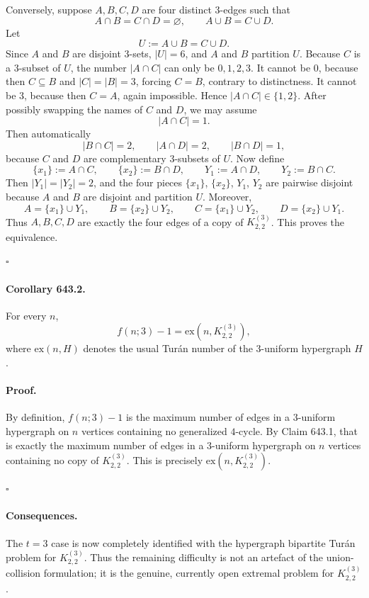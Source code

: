 Conversely, suppose $A,B,C,D$ are four distinct $3$-edges such that
\[
A\cap B=C\cap D=\varnothing,
\qquad
A\cup B=C\cup D.
\]
Let
\[
U:=A\cup B=C\cup D.
\]
Since $A$ and $B$ are disjoint $3$-sets, $|U|=6$, and $A$ and $B$ partition $U$.
Because $C$ is a $3$-subset of $U$, the number $|A\cap C|$ can only be $0,1,2,3$.
It cannot be $0$, because then $C\subseteq B$ and $|C|=|B|=3$, forcing $C=B$, contrary to distinctness.
It cannot be $3$, because then $C=A$, again impossible.
Hence $|A\cap C|\in\{1,2\}$.
After possibly swapping the names of $C$ and $D$, we may assume
\[
|A\cap C|=1.
\]
Then automatically
\[
|B\cap C|=2,
\qquad
|A\cap D|=2,
\qquad
|B\cap D|=1,
\]
because $C$ and $D$ are complementary $3$-subsets of $U$.
Now define
\[
\{x_1\}:=A\cap C,
\qquad
\{x_2\}:=B\cap D,
\qquad
Y_1:=A\cap D,
\qquad
Y_2:=B\cap C.
\]
Then $|Y_1|=|Y_2|=2$, and the four pieces $\{x_1\}$, $\{x_2\}$, $Y_1$, $Y_2$ are pairwise disjoint because $A$ and $B$ are disjoint and partition $U$.
Moreover,
\[
A=\{x_1\}\cup Y_1,
\qquad
B=\{x_2\}\cup Y_2,
\qquad
C=\{x_1\}\cup Y_2,
\qquad
D=\{x_2\}\cup Y_1.
\]
Thus $A,B,C,D$ are exactly the four edges of a copy of $K^{(3)}_{2,2}$.
This proves the equivalence.

\hfill$\square$

\paragraph{Corollary 643.2.}
For every $n$,
\[
 f(n;3)-1 = \mathrm{ex}(n,K^{(3)}_{2,2}),
\]
where $\mathrm{ex}(n,H)$ denotes the usual Tur\'an number of the $3$-uniform hypergraph $H$.

\paragraph{Proof.}
By definition, $f(n;3)-1$ is the maximum number of edges in a $3$-uniform hypergraph on $n$ vertices containing no generalized $4$-cycle.  By Claim 643.1, that is exactly the maximum number of edges in a $3$-uniform hypergraph on $n$ vertices containing no copy of $K^{(3)}_{2,2}$.  This is precisely $\mathrm{ex}(n,K^{(3)}_{2,2})$.

\hfill$\square$

\paragraph{Consequences.}
The $t=3$ case is now completely identified with the hypergraph bipartite Tur\'an problem for $K^{(3)}_{2,2}$.  Thus the remaining difficulty is not an artefact of the union-collision formulation; it is the genuine, currently open extremal problem for $K^{(3)}_{2,2}$.

